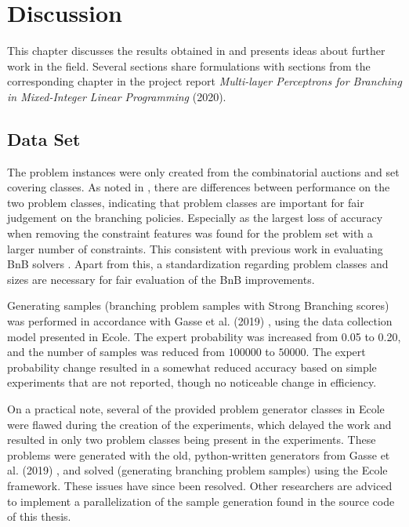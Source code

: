 \chapter{Discussion}\label{cha:discussion}

This chapter discusses the results obtained in  and presents ideas about further work in the field. Several sections share formulations with sections from the corresponding chapter in the project report \textit{Multi-layer Perceptrons for Branching in Mixed-Integer Linear Programming} (2020). 


\section{Data Set}\label{sec:dis_data}

The problem instances were only created from the combinatorial auctions and set covering classes. As noted in , there are differences between performance on the two problem classes, indicating that problem classes are important for fair judgement on the branching policies. Especially as the largest loss of accuracy when removing the constraint features was found for the problem set with a larger number of constraints. This consistent with previous work in evaluating \gls{BnB} solvers \cite{anand2017comparative}. Apart from this, a standardization regarding problem classes and sizes are necessary for fair evaluation of the \gls{BnB} improvements.

Generating samples (branching problem samples with Strong Branching scores) was performed in accordance with Gasse et al. (2019) \cite{gasse2019exact}, using the data collection model presented in \gls{Ecole}. The expert probability was increased from 0.05 to 0.20, and the number of samples was reduced from $100000$ to $50000$. The expert probability change resulted in a somewhat reduced accuracy based on simple experiments that are not reported, though no noticeable change in efficiency.  

On a practical note, several of the provided problem generator classes in \gls{Ecole} were flawed during the creation of the experiments, which delayed the work and resulted in only two problem classes being present in the experiments. These problems were generated with the old, python-written generators from Gasse et al. (2019) \cite{gasse2019exact}, and solved (generating branching problem samples) using the \gls{Ecole} framework. These issues have since been resolved. Other researchers are adviced to implement a parallelization of the sample generation found in the source code of this thesis. 

